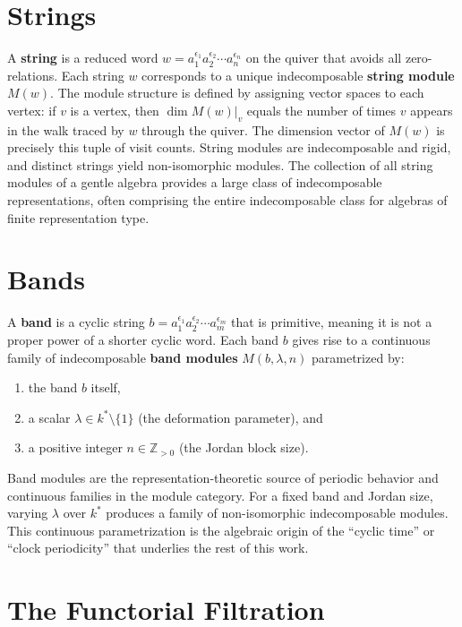 \documentclass[11pt,oneside]{amsbook}
\numberwithin{equation}{section}
\theoremstyle{plain}
\theoremstyle{definition}
\theoremstyle{remark}
\begin{document}
	\section{Strings}
	A \textbf{string} is a reduced word $w = a_1^{\epsilon_1} a_2^{\epsilon_2} \cdots a_n^{\epsilon_n}$ on the quiver that avoids all zero-relations. Each string $w$ corresponds to a unique indecomposable \textbf{string module} $M(w)$. The module structure is defined by assigning vector spaces to each vertex: if $v$ is a vertex, then $\dim M(w)|_v$ equals the number of times $v$ appears in the walk traced by $w$ through the quiver. The dimension vector of $M(w)$ is precisely this tuple of visit counts. String modules are indecomposable and rigid, and distinct strings yield non-isomorphic modules. The collection of all string modules of a gentle algebra provides a large class of indecomposable representations, often comprising the entire indecomposable class for algebras of finite representation type.

	\section{Bands}
	A \textbf{band} is a cyclic string $b = a_1^{\epsilon_1} a_2^{\epsilon_2} \cdots a_m^{\epsilon_m}$ that is primitive, meaning it is not a proper power of a shorter cyclic word. Each band $b$ gives rise to a continuous family of indecomposable \textbf{band modules} $M(b, \lambda, n)$ parametrized by:
	\begin{enumerate}
		\item the band $b$ itself,
		\item a scalar $\lambda \in k^* \setminus \{1\}$ (the deformation parameter), and
		\item a positive integer $n \in \mathbb{Z}_{>0}$ (the Jordan block size).
	\end{enumerate}
	Band modules are the representation-theoretic source of periodic behavior and continuous families in the module category. For a fixed band and Jordan size, varying $\lambda$ over $k^*$ produces a family of non-isomorphic indecomposable modules. This continuous parametrization is the algebraic origin of the ``cyclic time'' or ``clock periodicity'' that underlies the rest of this work.
	\section{The Functorial Filtration}
	\label{ch:9}
	
\end{document}
